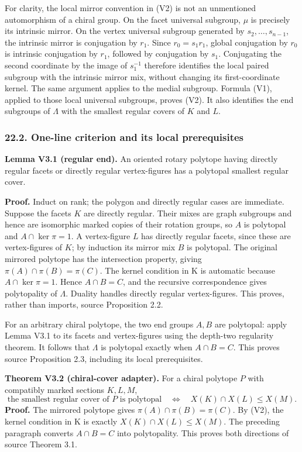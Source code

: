 \documentclass[
  10pt,
  letterpaper,
]{article}
\begin{document}
For clarity, the local mirror convention in (V2) is not an unmentioned
automorphism of a chiral group. On the facet universal subgroup, \(\mu\)
is precisely its intrinsic mirror. On the vertex universal subgroup
generated by \(s_2,\ldots,s_{n-1}\), the intrinsic mirror is conjugation
by \(r_1\). Since \(r_0=s_1r_1\), global conjugation by \(r_0\) is
intrinsic conjugation by \(r_1\), followed by conjugation by \(s_1\).
Conjugating the second coordinate by the image of \(s_1^{-1}\) therefore
identifies the local paired subgroup with the intrinsic mirror mix,
without changing its first-coordinate kernel. The same argument applies
to the medial subgroup. Formula (V1), applied to those local universal
subgroups, proves (V2). It also identifies the end subgroups of
\(\Lambda\) with the smallest regular covers of \(K\) and \(L\).

\subsubsection{22.2. One-line criterion and its local
prerequisites}\label{one-line-criterion-and-its-local-prerequisites}

\textbf{Lemma V3.1 (regular end).} An oriented rotary polytope having
directly regular facets or directly regular vertex-figures has a
polytopal smallest regular cover.

\textbf{Proof.} Induct on rank; the polygon and directly regular cases
are immediate. Suppose the facets \(K\) are directly regular. Their
mixes are graph subgroups and hence are isomorphic marked copies of
their rotation groups, so \(A\) is polytopal and \(A\cap\ker\pi=1\). A
vertex-figure \(L\) has directly regular facets, since these are
vertex-figures of \(K\); by induction its mirror mix \(B\) is polytopal.
The original mirrored polytope has the intersection property, giving
\(\pi(A)\cap\pi(B)=\pi(C)\). The kernel condition in K is automatic
because \(A\cap\ker\pi=1\). Hence \(A\cap B=C\), and the recursive
correspondence gives polytopality of \(\Lambda\). Duality handles
directly regular vertex-figures. This proves, rather than imports,
source Proposition 2.2.

For an arbitrary chiral polytope, the two end groups \(A,B\) are
polytopal: apply Lemma V3.1 to its facets and vertex-figures using the
depth-two regularity theorem. It follows that \(\Lambda\) is polytopal
exactly when \(A\cap B=C\). This proves source Proposition 2.3,
including its local prerequisites.

\textbf{Theorem V3.2 (chiral-cover adapter).} For a chiral polytope
\(P\) with compatibly marked sections \(K,L,M\), \[
 \text{the smallest regular cover of }P\text{ is polytopal}
 \quad\Longleftrightarrow\quad X(K)\cap X(L)\le X(M).       \tag{V3}
\] \textbf{Proof.} The mirrored polytope gives
\(\pi(A)\cap\pi(B)=\pi(C)\). By (V2), the kernel condition in K is
exactly \(X(K)\cap X(L)\le X(M)\). The preceding paragraph converts
\(A\cap B=C\) into polytopality. This proves both directions of source
Theorem 3.1.
\end{document}
